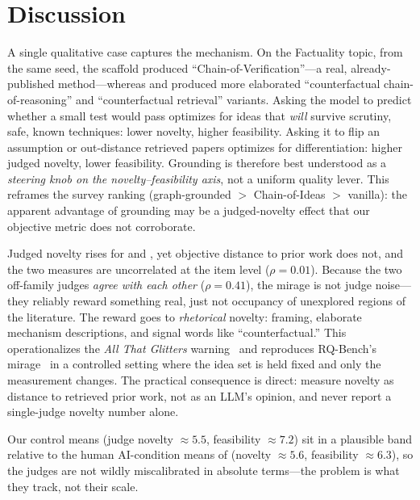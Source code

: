 \section{Discussion}
\label{sec:discussion}

 A single qualitative case captures the mechanism. On the Factuality topic, from the same seed, the \smallexp scaffold produced ``Chain-of-Verification''---a real, already-published method---whereas \litcomp and \deduction produced more elaborated ``counterfactual chain-of-reasoning'' and ``counterfactual retrieval'' variants. Asking the model to predict whether a small test would pass optimizes for ideas that \emph{will} survive scrutiny, \ie safe, known techniques: lower novelty, higher feasibility. Asking it to flip an assumption or out-distance retrieved papers optimizes for differentiation: higher judged novelty, lower feasibility. Grounding is therefore best understood as a \emph{steering knob on the novelty--feasibility axis}, not a uniform quality lever. This reframes the survey ranking (graph-grounded $>$ Chain-of-Ideas $>$ vanilla): the apparent advantage of grounding may be a judged-novelty effect that our objective metric does not corroborate.

 Judged novelty rises for \deduction and \litcomp, yet objective distance to prior work does not, and the two measures are uncorrelated at the item level ($\rho = 0.01$). Because the two off-family judges \emph{agree with each other} ($\rho = 0.41$), the mirage is not judge noise---they reliably reward something real, just not occupancy of unexplored regions of the literature. The reward goes to \emph{rhetorical} novelty: framing, elaborate mechanism descriptions, and signal words like ``counterfactual.'' This operationalizes the \emph{All That Glitters} warning~\citep{glitters2025} and reproduces RQ-Bench's mirage~\citep{rqbench2026} in a controlled setting where the idea set is held fixed and only the measurement changes. The practical consequence is direct: measure novelty as distance to retrieved prior work, not as an LLM's opinion, and never report a single-judge novelty number alone.

 Our control means (judge novelty $\approx 5.5$, feasibility $\approx 7.2$) sit in a plausible band relative to the human AI-condition means of \citet{si2024can} (novelty $\approx 5.6$, feasibility $\approx 6.3$), so the judges are not wildly miscalibrated in absolute terms---the problem is what they track, not their scale.


